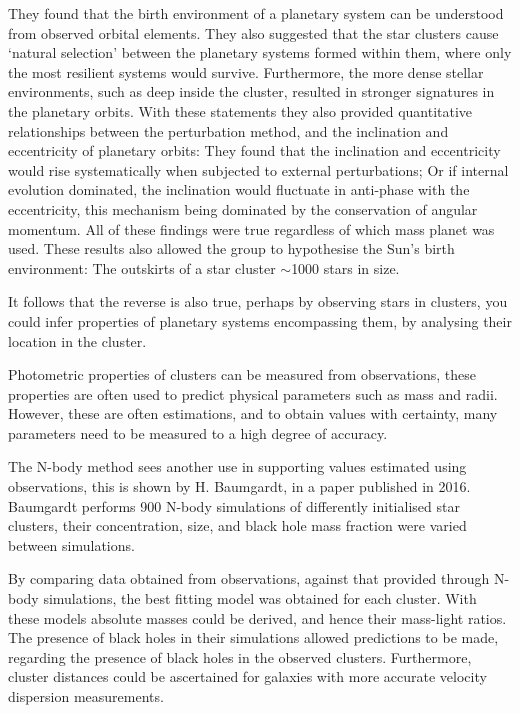 \documentclass[a4paper,10pt]{article}
\begin{document}
They found that the birth environment of a planetary system can be understood from observed orbital elements. They also suggested that the star clusters cause `natural selection' between the planetary systems formed within them, where only the most resilient systems would survive. Furthermore, the more dense stellar environments, such as deep inside the cluster, resulted in stronger signatures in the planetary orbits. With these statements they also provided quantitative relationships between the perturbation method, and the inclination and eccentricity of planetary orbits: They found that the inclination and eccentricity would rise systematically when subjected to external perturbations; Or if internal evolution dominated, the inclination would fluctuate in anti-phase with the eccentricity, this mechanism being dominated by the conservation of angular momentum. All of these findings were true regardless of which mass planet was used. These results also allowed the group to hypothesise the Sun's birth environment: The outskirts of a star cluster $\sim$1000 stars in size.

It follows that the reverse is also true, perhaps by observing stars in clusters, you could infer properties of planetary systems encompassing them, by analysing their location in the cluster. 

Photometric properties of clusters can be measured from observations, these properties are often used to predict physical parameters such as mass and radii. However, these are often estimations, and to obtain values with certainty, many parameters need to be measured to a high degree of accuracy.

The N-body method sees another use in supporting values estimated using observations, this is shown by H. Baumgardt, in a paper published in 2016\cite{Baumgardt}. Baumgardt performs 900 N-body simulations of differently initialised star clusters, their concentration, size, and black hole mass fraction were varied between simulations. 

By comparing data obtained from observations, against that provided through N-body simulations, the best fitting model was obtained for each cluster. With these models absolute masses could be derived, and hence their mass-light ratios. The presence of black holes in their simulations allowed predictions to be made, regarding the presence of black holes in the observed clusters. Furthermore, cluster distances could be ascertained for galaxies with more accurate velocity dispersion measurements.
\end{document}
